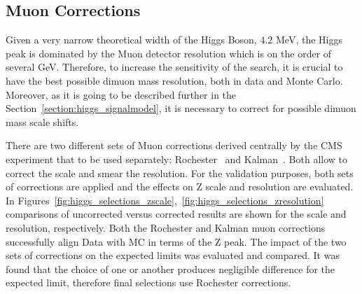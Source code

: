 \subsection{Muon Corrections}
Given a very narrow theoretical width of the Higgs Boson, $4.2$ MeV, the Higgs peak is dominated by the Muon detector resolution which is on the order of several GeV. Therefore, to increase the sensitivity of the search, it is crucial to have the best possible dimuon mass resolution, both in data and Monte Carlo. Moreover, as it is going to be described further in the Section~\ref{section:higgs_signalmodel}, it is necessary to correct for possible dimuon mass scale shifts.

There are two different sets of Muon corrections derived centrally by the CMS experiment that to be used separately: Rochester~\cite{CMSRochesterCorrections} and Kalman~\cite{CMSKalmanCorrections}. Both allow to correct the scale and smear the resolution. For the validation purposes, both sets of corrections are applied and the effects on Z scale and resolution are evaluated. In Figures~\ref{fig:higgs_selections_zscale},~\ref{fig:higgs_selections_zresolution} comparisons of uncorrected versus corrected results are shown for the scale and resolution, respectively. Both the Rochester and Kalman muon corrections successfully align Data with MC in terms of the Z peak. The impact of the two sets of corrections on the expected limits was evaluated and compared. It was found that the choice of one or another produces negligible difference for the expected limit, therefore final selections use Rochester corrections.

